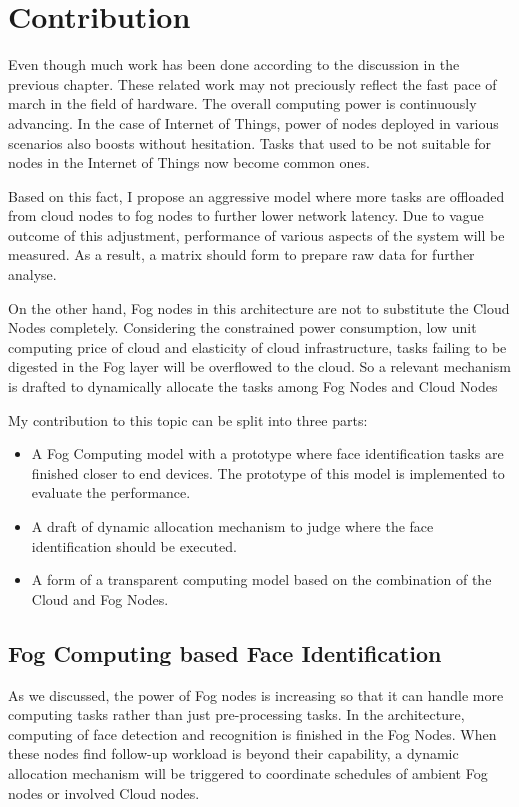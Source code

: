 \chapter{Contribution} \label{chap:contribution}

Even though much work has been done according to the discussion in the previous chapter. These related work may not preciously reflect the fast pace of march in the field of hardware. The overall computing power is continuously advancing. In the case of Internet of Things, power of nodes deployed in various scenarios also boosts without hesitation. Tasks that used to be not suitable for nodes in the Internet of Things now become common ones. 

Based on this fact, I propose an aggressive model where more tasks are offloaded from cloud nodes to fog nodes to further lower network latency. Due to vague outcome of this adjustment, performance of various aspects of the system will be measured. As a result, a matrix should form to prepare raw data for further analyse.

On the other hand, Fog nodes in this architecture are not to substitute the Cloud Nodes completely. Considering the constrained power consumption, low unit computing price of cloud and elasticity of cloud infrastructure, tasks failing to be digested in the Fog layer will be overflowed to the cloud. So a relevant mechanism is drafted to dynamically allocate the tasks among Fog Nodes and Cloud Nodes

My contribution to this topic can be split into three parts:
\begin{itemize}
    \item A Fog Computing model with a prototype where face identification tasks are finished closer to end devices. The prototype of this model is implemented to evaluate the performance.
    \item A draft of dynamic allocation mechanism to judge where the face identification should be executed.
   \item A form of a transparent computing model based on the combination of the Cloud and Fog Nodes.
\end{itemize}

\section{Fog Computing based Face Identification}
As we discussed, the power of Fog nodes is increasing so that it can handle more computing tasks rather than just pre-processing tasks. In the architecture, computing of face detection and recognition is finished in the Fog Nodes. When these nodes find follow-up workload is beyond their capability, a dynamic allocation mechanism will be triggered to coordinate schedules of ambient Fog nodes or involved Cloud nodes. 

